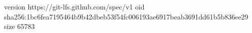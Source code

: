 version https://git-lfs.github.com/spec/v1
oid sha256:1bc6fea7195464b9b42dbeb53f54fc006193ae6917beab3691dd61b5b836ee29
size 65783
